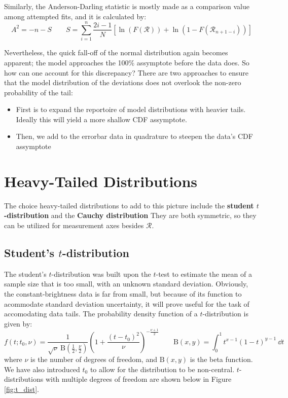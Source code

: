 \documentclass[12pt, a4paper]{article}
\begin{document}
Similarly, the Anderson-Darling statistic is mostly made as a comparison value among attempted fits, and it is calculated by:
\[
A^2 = -n - S
\qquad
S = \sum _{i=1}^{n}\frac{2i-1}{N}
\left[\ln(F(\mathcal{R})) + \ln(1-F(\mathcal{R}_{n+1-i}))
\right]
\]

Nevertheless, the quick fall-off of the normal distribution again becomes apparent;
the model approaches the 100\% assymptote before the data does. 
So how can one account for this discrepancy?
There are two approaches to ensure that the model distribution of the deviations does not overlook the non-zero probability of the tail:
\begin{itemize}
\item First is to expand the reportoire of model distributions with heavier tails.
Ideally this will yield a more shallow CDF assymptote.
\item Then, we add to the errorbar data in quadrature to steepen the data's CDF assymptote
\end{itemize}

\section{Heavy-Tailed Distributions}

The choice heavy-tailed distributions to add to this picture include the \textbf{student $t$-distribution} and the \textbf{Cauchy distribution}
They are both symmetric, so they can be utilized for measurement axes besides $\mathcal{R}$.

\subsection{Student's $t$-distribution}

The student's $t$-distribution was built upon the $t$-test to estimate the mean of a sample size that is too small, with an unknown standard deviation.
Obviously, the constant-brightness data is far from small, but because of its function to acommodate standard deviation uncertainty, it will prove useful for the task of accomodating data tails.
The probability density function of a $t$-distribution is given by:
\[
f(t; t_0, \nu) = \frac{1}{\sqrt{\nu}\ \mathrm{B}(\frac12, \frac{\nu}{2})}
\left( 1+\frac{(t-t_0)^2}{\nu}\right)^{-\frac{\nu+1}{2}}
\qquad
\mathrm{B}(x,y) = \int_0^1t^{x-1}(1-t)^{y-1}\ \dd t
\]
where $\nu$ is the number of degrees of freedom, and $\mathrm{B}(x,y)$ is the beta function.
We have also introduced $t_0$ to allow for the distribution to be non-central.
$t$-distributions with multiple degrees of freedom are shown below in Figure \ref{fig:t_dist}.
\end{document}
